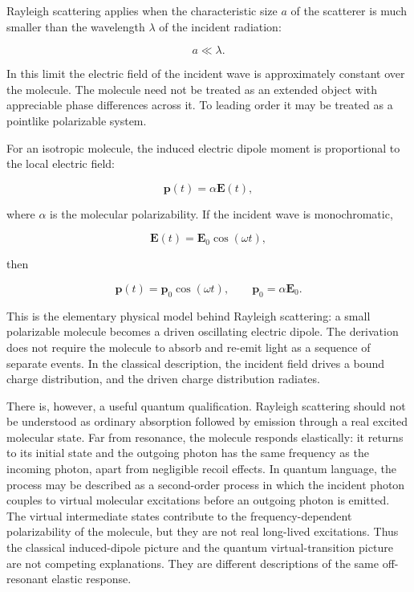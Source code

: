 \documentclass[11pt,a4paper]{article}
\begin{document}
Rayleigh scattering applies when the characteristic size \(a\) of the
scatterer is much smaller than the wavelength \(\lambda\) of the incident
radiation:

\begin{equation}
a \ll \lambda.
\end{equation}

In this limit the electric field of the incident wave is approximately
constant over the molecule. The molecule need not be treated as an extended
object with appreciable phase differences across it. To leading order it may
be treated as a pointlike polarizable system.

For an isotropic molecule, the induced electric dipole moment is proportional
to the local electric field:

\begin{equation}
\mathbf{p}(t) = \alpha \mathbf{E}(t),
\end{equation}

where \(\alpha\) is the molecular polarizability. If the incident wave is
monochromatic,

\begin{equation}
\mathbf{E}(t) = \mathbf{E}_0 \cos(\omega t),
\end{equation}

then

\begin{equation}
\mathbf{p}(t) = \mathbf{p}_0 \cos(\omega t),
\qquad
\mathbf{p}_0 = \alpha \mathbf{E}_0.
\end{equation}

This is the elementary physical model behind Rayleigh scattering: a small
polarizable molecule becomes a driven oscillating electric dipole. The
derivation does not require the molecule to absorb and re-emit light as a
sequence of separate events. In the classical description, the incident field
drives a bound charge distribution, and the driven charge distribution
radiates.

There is, however, a useful quantum qualification. Rayleigh scattering should
not be understood as ordinary absorption followed by emission through a real
excited molecular state. Far from resonance, the molecule responds
elastically: it returns to its initial state and the outgoing photon has the
same frequency as the incoming photon, apart from negligible recoil effects.
In quantum language, the process may be described as a second-order process in
which the incident photon couples to virtual molecular excitations before an
outgoing photon is emitted. The virtual intermediate states contribute to the
frequency-dependent polarizability of the molecule, but they are not real
long-lived excitations. Thus the classical induced-dipole picture and the
quantum virtual-transition picture are not competing explanations. They are
different descriptions of the same off-resonant elastic response.
\end{document}
